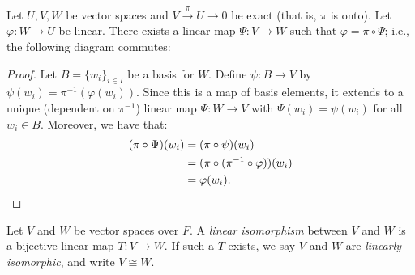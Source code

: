     \begin{proposition}
        Let $U,V,W$ be vector spaces and $V \xrightarrow{\pi}U \rightarrow 0$ be exact (that is, $\pi$ is onto). Let $\varphi:W \rightarrow U$ be linear. There exists a linear map $\Psi:V \rightarrow W$ such that $\varphi = \pi \circ \Psi$; i.e., the following diagram commutes:
            \begin{center}
            \end{center}
    \end{proposition}
        \begin{proof}
            Let $B = \{w_i\}_{i \in I}$ be a basis for $W$. Define $\psi:B \rightarrow V$ by $\psi(w_i) = \pi^{-1}(\varphi(w_i))$. Since this is a map of basis elements, it extends to a unique (dependent on $\pi^{-1}$) linear map $\Psi:W \rightarrow V$ with $\Psi(w_i) = \psi(w_i)$ for all $w_i \in B$. Moreover, we have that:
                \begin{equation*}
                \begin{split}
                    (\pi \circ \Psi)(w_i)
                    & = (\pi \circ \psi)(w_i) \\
                    & = (\pi \circ (\pi^{-1} \circ \varphi))(w_i) \\
                    & = \varphi(w_i). \qedhere
                \end{split}
                \end{equation*}
        \end{proof}

    \begin{definition}
        Let $V$ and $W$ be vector spaces over $F$. A \textit{linear isomorphism} between $V$ and $W$ is a bijective linear map $T:V \rightarrow W$. If such a $T$ exists, we say $V$ and $W$ are \textit{linearly isomorphic}, and write $V \cong W$.
    \end{definition}

    \begin{center}
    \end{center}

